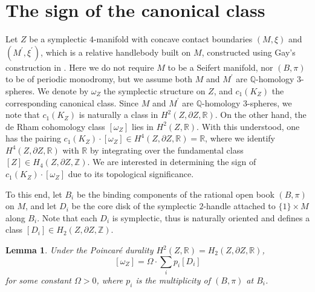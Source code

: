 \documentclass[11pt]{amsart}
\theoremstyle{plain}
\numberwithin{theorem}{section}
\newtheorem{lemma}[theorem]{Lemma}
\theoremstyle{definition}
\newcommand{\R}{{\mathbb R}}
\newcommand{\Z}{{\mathbb Z}}
\newcommand{\Q}{{\mathbb Q}}
\begin{document}
\section{The sign of the canonical class}
Let $Z$ be a symplectic $4$-manifold with concave contact boundaries $(M,\xi)$ and 
$(M^\prime,\xi^\prime)$, which is a relative handlebody built on $M$, constructed using Gay's construction in \cite{G}. Here we do not require $M$ to be a Seifert manifold, nor $(B,\pi)$ to be of periodic monodromy, but we assume both $M$ and $M^\prime$ are $\Q$-homology $3$-spheres.
We denote by $\omega_Z$ the symplectic structure on $Z$, and $c_1(K_Z)$ the corresponding canonical class. Since $M$ and $M^\prime$ are $\Q$-homology $3$-spheres, we note that 
$c_1(K_Z)$ is naturally a class in $H^2(Z,\partial Z,\R)$. On the other hand, the de Rham cohomology class $[\omega_Z]$ lies in $H^2(Z,\R)$. With this understood, one has the pairing $c_1(K_Z)\cdot [\omega_Z]\in H^4(Z,\partial Z,\R)=\R$, where we identify $H^4(Z,\partial Z,\R)$ with $\R$ by integrating over the fundamental class $[Z]\in H_4(Z,\partial Z,\Z)$. We are interested in determining the sign of $c_1(K_Z)\cdot [\omega_Z]$ due to its topological significance.

To this end, let $B_i$ be the binding components of the rational open book $(B,\pi)$ on $M$, and let
$D_i$ be the core disk of the symplectic $2$-handle attached to $\{1\}\times M$ along $B_i$. Note that each $D_i$ is symplectic, thus is naturally oriented and defines a class $[D_i]\in H_2(Z,\partial Z,\Z)$.

\begin{lemma}
Under the Poincar\'{e} durality $H^2(Z,\R)=H_2(Z,\partial Z,\R)$, 
$$
[\omega_Z]=\Omega\cdot \sum_i p_i [D_i]
$$
for some constant $\Omega>0$, where $p_i$ is the multiplicity of $(B,\pi)$ at $B_i$.
\end{lemma}
\end{document}
